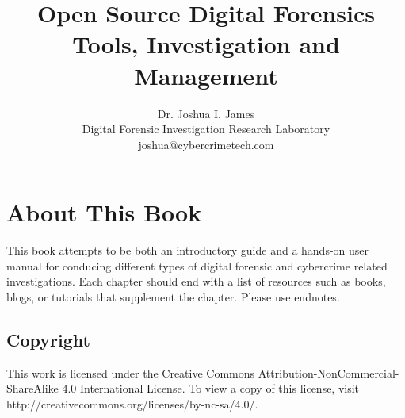 \documentclass[12pt,a4paper]{book}
\author{Dr. Joshua I. James\\
Digital Forensic Investigation Research Laboratory\\
joshua@cybercrimetech.com}
\title{Open Source Digital Forensics\\Tools, Investigation and Management}
\begin{document}
\maketitle

\frontmatter
\chapter{About This Book}
This book attempts to be both an introductory guide and a hands-on user manual for conducing different types of digital forensic and cybercrime related investigations. Each chapter should end with a list of resources such as books, blogs, or tutorials that supplement the chapter. Please use endnotes.

\section*{Copyright}
This work is licensed under the Creative Commons Attribution-NonCommercial-ShareAlike 4.0 International License. To view a copy of this license, visit http://creativecommons.org/licenses/by-nc-sa/4.0/.

\tableofcontents

\mainmatter



\end{document}
